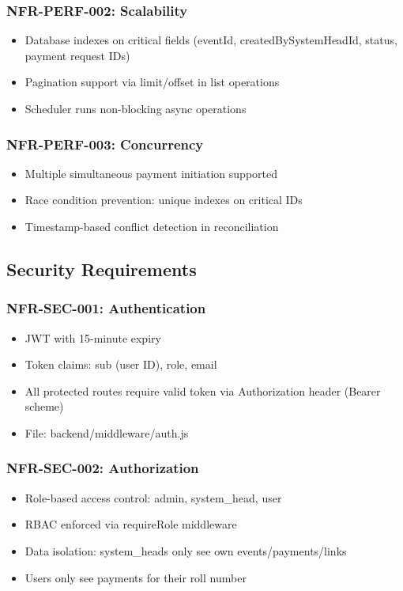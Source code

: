 \documentclass[12pt,a4paper]{article}
\begin{document}
\subsubsection{NFR-PERF-002: Scalability}
\begin{itemize}
  \item Database indexes on critical fields (eventId, createdBySystemHeadId, status, payment request IDs)
  \item Pagination support via limit/offset in list operations
  \item Scheduler runs non-blocking async operations
\end{itemize}

\subsubsection{NFR-PERF-003: Concurrency}
\begin{itemize}
  \item Multiple simultaneous payment initiation supported
  \item Race condition prevention: unique indexes on critical IDs
  \item Timestamp-based conflict detection in reconciliation
\end{itemize}

\subsection{Security Requirements}

\subsubsection{NFR-SEC-001: Authentication}
\begin{itemize}
  \item JWT with 15-minute expiry
  \item Token claims: sub (user ID), role, email
  \item All protected routes require valid token via Authorization header (Bearer scheme)
  \item File: backend/middleware/auth.js
\end{itemize}

\subsubsection{NFR-SEC-002: Authorization}
\begin{itemize}
  \item Role-based access control: admin, system\_head, user
  \item RBAC enforced via requireRole middleware
  \item Data isolation: system\_heads only see own events/payments/links
  \item Users only see payments for their roll number
\end{itemize}
\end{document}

